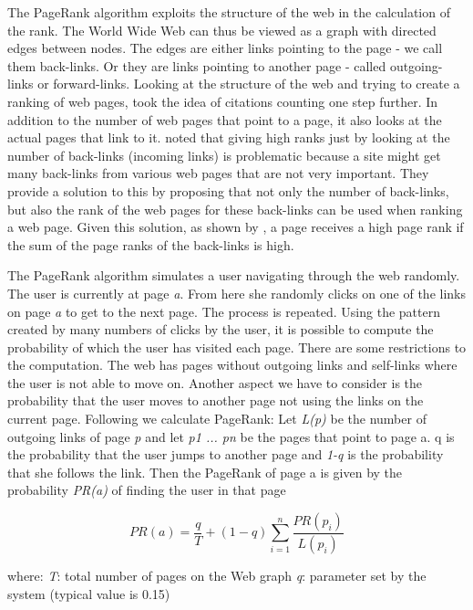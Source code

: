 The PageRank algorithm exploits the structure of the web in the calculation of the rank. The World Wide Web can thus be viewed as a graph with directed edges between nodes. The edges are either links pointing to the page - we call them back-links. Or they are links pointing to another page - called outgoing-links or forward-links. Looking at the structure of the web and trying to create a ranking of web pages, \citet{Page1999} took the idea of citations counting one step further. In addition to the number of web pages that point to a page, it also looks at the actual pages that link to it. \citet{Page1999} noted that giving high ranks just by looking at the number of back-links (incoming links) is problematic because a site might get many back-links from various web pages that are not very important. They provide a solution to this by proposing that not only the number of back-links, but also the rank of the web pages for these back-links can be used when ranking a web page. Given this solution, as shown by \citet{Page1999}, a page receives a high page rank if the sum of the page ranks of the back-links is high.

The PageRank algorithm simulates a user navigating through the web randomly. The user is currently at page \emph{a}. From here she randomly clicks on one of the links on page \emph{a} to get to the next page. The process is repeated. Using the pattern created by many numbers of clicks by the user, it is possible to compute the probability of which the user has visited each page. There are some restrictions to the computation. The web has pages without outgoing links and self-links where the user is not able to move on. Another aspect we have to consider is the probability that the user moves to another page not using the links on the current page. Following we calculate PageRank:
Let \emph{L(p)} be the number of outgoing links of page \emph{p} and let \emph{p1 ... pn} be the pages that point to page a. q is the probability that the user jumps to another page and \emph{1-q} is the probability that she follows the link.  Then the PageRank of page a is given by the probability \emph{PR(a)} of finding the user in that page

\begin{displaymath}
PR(a) = \frac{q}{T} + (1 − q) \sum_{i=1}^{n} \frac{PR(p_i)}{L(p_i)}
\end{displaymath}

where:\newline
\emph{T}: total number of pages on the Web graph\newline
\emph{q}: parameter set by the system (typical value is 0.15)

